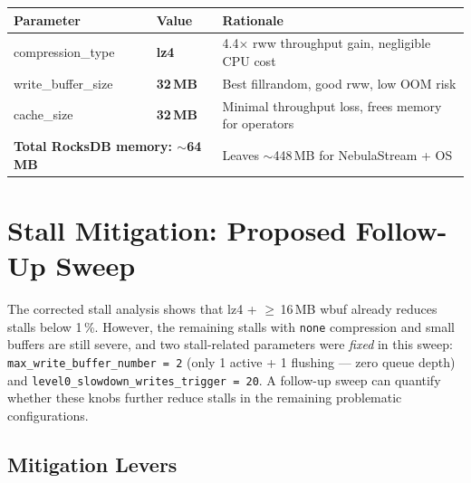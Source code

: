 \documentclass[10pt,a4paper]{scrartcl}
\begin{document}
{\centering
\begin{tabular}{llp{7.5cm}}
  \toprule
  \textbf{Parameter} & \textbf{Value} & \textbf{Rationale} \\
  \midrule
  \rowcolor{goodrow} compression\_type & \textbf{lz4} & 4.4$\times$ rww throughput gain, negligible CPU cost \\
  \rowcolor{goodrow} write\_buffer\_size & \textbf{32\,MB} & Best fillrandom, good rww, low OOM risk \\
  \rowcolor{goodrow} cache\_size & \textbf{32\,MB} & Minimal throughput loss, frees memory for operators \\
  \midrule
  \multicolumn{2}{l}{\textbf{Total RocksDB memory: $\sim$64\,MB}} & Leaves $\sim$448\,MB for NebulaStream + OS \\
  \bottomrule
\end{tabular}
\par}

\section{Stall Mitigation: Proposed Follow-Up Sweep}

The corrected stall analysis shows that lz4 + $\geq$\,16\,MB wbuf already
reduces stalls below 1\,\%. However, the remaining stalls with
\texttt{none} compression and small buffers are still severe, and two
stall-related parameters were \emph{fixed} in this sweep:
\texttt{max\_write\_buffer\_number\,=\,2} (only 1 active + 1 flushing ---
zero queue depth) and \texttt{level0\_slowdown\_writes\_trigger\,=\,20}.
A follow-up sweep can quantify whether these knobs further reduce stalls
in the remaining problematic configurations.

\subsection{Mitigation Levers}
\end{document}
